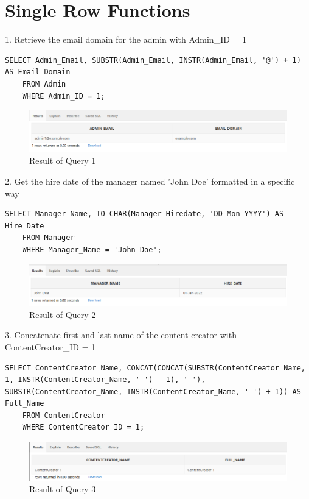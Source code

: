 \clearpage
\section[Single Row Functions]{Single Row Functions}
\hrulefill

1. Retrieve the email domain for the admin with Admin\_ID = 1


\begin{lstlisting}[caption={ Query 1},label={lst:q-1}]
    SELECT Admin_Email, SUBSTR(Admin_Email, INSTR(Admin_Email, '@') + 1) AS Email_Domain
    FROM Admin
    WHERE Admin_ID = 1;
\end{lstlisting}

\begin{figure}[H]
    \centering
    \includegraphics[width=1\textwidth]{images/dml/SingleRaw/Q1.png}
    \caption{Result of Query 1}
\end{figure}

 2. Get the hire date of the manager named 'John Doe' formatted in a specific way

\begin{lstlisting}[caption={ Query 2},label={lst:q-2}]
    SELECT Manager_Name, TO_CHAR(Manager_Hiredate, 'DD-Mon-YYYY') AS Hire_Date
    FROM Manager
    WHERE Manager_Name = 'John Doe';
\end{lstlisting}

\begin{figure}[H]
    \centering
    \includegraphics[width=1\textwidth]{images/dml/SingleRaw/Q2.png}
    \caption{Result of Query 2}
\end{figure}

3. Concatenate first and last name of the content creator with ContentCreator\_ID = 1

\begin{lstlisting}[caption={ Query 3},label={lst:q-3}]
    SELECT ContentCreator_Name, CONCAT(CONCAT(SUBSTR(ContentCreator_Name, 1, INSTR(ContentCreator_Name, ' ') - 1), ' '), SUBSTR(ContentCreator_Name, INSTR(ContentCreator_Name, ' ') + 1)) AS Full_Name
    FROM ContentCreator
    WHERE ContentCreator_ID = 1;
\end{lstlisting}

\begin{figure}[H]
    \centering
    \includegraphics[width=1\textwidth]{images/dml/SingleRaw/Q3.png}
    \caption{Result of Query 3}
\end{figure}
